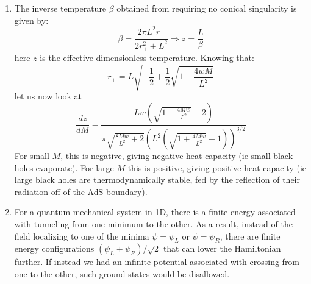 \documentclass[11pt, class=article, crop=false]{standalone}
\begin{document}
\begin{enumerate}
	As we know by now, for a hypersurface orthogonal to the coordinate system,
	\[
		K_{\mu \nu} = \frac12 n^r \d_r g_{\mu \nu}
	\]
	Here $n^\rho \d_\rho$ is the unit vector in the $r$ direction, whose $r$ component is $\frac{1}{\sqrt{g_{rr}}}$. We get:
	\[
		K_{\mu \nu} = \frac12 \frac{1}{\sqrt{g_{rr}}} (-g_{tt}'(r) dt^2 + 2 r\, d\Omega_3^2) \Rightarrow  \frac12 \frac{1}{\sqrt{g_{rr}}} \left(\frac{g_{tt}'(r)}{g_{tt}(r)} + \frac{6}{r} \right)
	\]
	For AdS Schwarzschild the metric is
	\[
		ds^2 = -\left(1 + \frac{r^2}{L^2} - \frac{w M}{r^2} \right) dt^2 + \left(1 + \frac{r^2}{L^2} - \frac{w M}{r^2} \right)^{-1} dr^2 +  r^2 d\Omega_3, \quad w = \frac{16 G_5}{3 \pi^2}
	\]
	Now, calculating $K$ for this we get:
	\[
		\frac12 \sqrt{1 + \frac{r^2}{L^2} - \frac{w M}{r^2}} \left(\frac{2 r^4 + 2 L^2 M w}{r^5 + L^2 r^3 - L^2 M r w} + \frac6r \right) \to \frac4L
	\]
	as $r \to \infty$. This is independent of $M$. As $r \to \infty, \sqrt{g}$ on a constant-$r$ slice approaches $\frac{r}{L} r^3 \to L^{-1} \epsilon^{-4}$ which is again independent of $M$. Defining $\sqrt{h^\epsilon} = \frac{L^4}{\epsilon^4}$ yields
	\[
		K \sqrt h = 4 L^4 \sqrt h
	\]
	Thus, the subleading terms go to zero as $r \to \infty$, and so the difference in the GH term between AdS-Schwarzschild and thermal AdS vanishes. 
	
	\item The inverse temperature $\beta$ obtained from requiring no conical singularity is given by:
	\[
		\beta = \frac{2 \pi L^2 r_+}{2 r_+^2 + L^2} \Rightarrow z = \frac{L}{\beta}
	\]
	here $z$ is the effective dimensionless temperature. Knowing that:
	\[
		r_+ = L \sqrt{-\frac12 + \frac12 \sqrt{1 + \frac{4 w M}{L^2}}}
	\]
	let us now look at
	\[
		\frac{dz}{dM} = \frac{L w \left(\sqrt{1 + \frac{4 M w}{L^2}}-2\right)}{\pi  \sqrt{\frac{8 M w}{L^2}+2} \left(L^2 \left(\sqrt{1 + \frac{4 M w}{L^2}}-1\right)\right)^{3/2}}
	\]
	For small $M$, this is negative, giving negative heat capacity (ie small black holes evaporate). For large $M$ this is positive, giving positive heat capacity (ie large black holes are thermodynamically stable, fed by the reflection of their radiation off of the AdS boundary).
	
	\item For a quantum mechanical system in 1D, there is a finite energy associated with tunneling from one minimum to the other. As a result, instead of the field localizing to one of the minima $\psi=\psi_L$ or $\psi = \psi_R$, there are finite energy configurations $(\psi_L \pm \psi_R)/\sqrt{2}$ that can lower the Hamiltonian further. If instead we had an infinite potential associated with crossing from one to the other, such ground states would be disallowed.
	

\end{enumerate}
\end{document}
